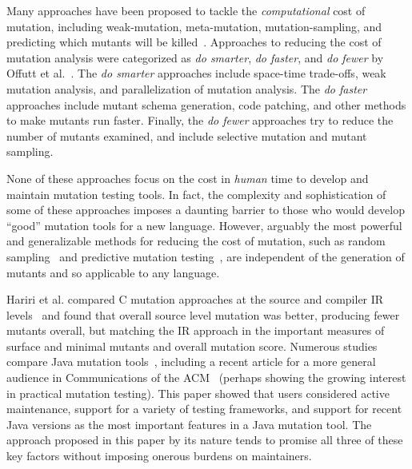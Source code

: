 \documentclass[sigconf,review, anonymous]{acmart}
\begin{document}
{Many approaches have been proposed to tackle the \emph{computational} cost of mutation, including weak-mutation, 
meta-mutation, mutation-sampling, and predicting which mutants will be
killed~\cite{offuttMutant1996,
  untch1993mutation,KaufmanFAKAJ2022,zhang2016pmt}.  Approaches to reducing the cost of
mutation analysis were categorized as \textit{do smarter}, \textit{do
faster}, and \textit{do fewer} by Offutt et al.~\cite{offutt2001mutation}.
The \textit{do smarter} approaches include space-time trade-offs, weak
mutation analysis, and parallelization of mutation analysis. The \textit{do
faster} approaches include mutant schema generation, code patching, and
other methods to make mutants run faster. Finally, the
\textit{do fewer} approaches try to reduce the number of mutants examined,
and include selective mutation and mutant sampling.

None of these approaches focus on the cost in \emph{human} time to
develop and maintain mutation testing tools.  In fact, the complexity
and sophistication of some of these approaches imposes a daunting
barrier to those who would develop ``good'' mutation tools for a new
language.  However, arguably the most powerful and generalizable
methods for reducing the cost of mutation, such as random sampling~\cite{GopinathSampleSize,gopinath2017mutation} and
predictive mutation testing~\cite{zhang2016pmt,kim2022predictive}, are independent of the generation of
mutants and so applicable to any language.

Hariri et al. compared C mutation approaches at the source and
compiler IR levels~\cite{CompareSrcBinary} and found that overall
source level mutation was better, producing fewer mutants overall, but
matching the IR approach in the important measures of surface and
minimal mutants and overall mutation score.  Numerous studies compare
Java mutation tools~\cite{MajorPIT,gopinath2017does}, including a
recent article for a more general audience in Communications of the
ACM~\cite{CommACMJavaTool} (perhaps showing the growing interest in
practical mutation testing).  This paper showed that users
considered active maintenance, support for a variety of testing
frameworks, and support for recent Java versions as the most important
features in a Java mutation tool.  The approach proposed in this paper
by its nature tends to promise all three of these key factors without
imposing onerous burdens on maintainers.

}
\end{document}
